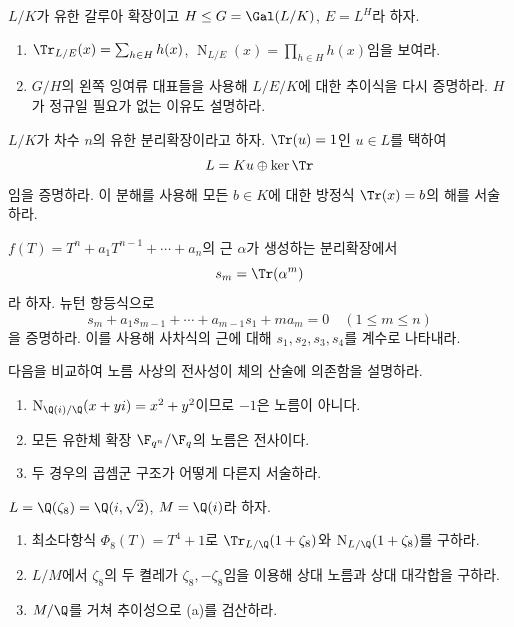 \begin{exercise}
$L/K$가 유한 갈루아 확장이고 $H\le G=\Gal(L/K)$, $E=L^H$라 하자.
\begin{enumerate}[label=(\alph*)]
  \item $\Tr_{L/E}(x)=\sum_{h\in H}h(x)$, $\operatorname N_{L/E}(x)=\prod_{h\in H}h(x)$임을 보여라.
  \item $G/H$의 왼쪽 잉여류 대표들을 사용해 $L/E/K$에 대한 추이식을 다시 증명하라. $H$가 정규일 필요가 없는 이유도 설명하라.
\end{enumerate}
\end{exercise}

\begin{exercise}
$L/K$가 차수 $n$의 유한 분리확장이라고 하자. $\Tr(u)=1$인 $u\in L$를 택하여
\[
  L=Ku\oplus\ker\Tr
\]
임을 증명하라. 이 분해를 사용해 모든 $b\in K$에 대한 방정식 $\Tr(x)=b$의 해를 서술하라.
\end{exercise}

\begin{exercise}
$f(T)=T^n+a_1T^{n-1}+\cdots+a_n$의 근 $\alpha$가 생성하는 분리확장에서
\[
  s_m=\Tr(\alpha^m)
\]
라 하자. 뉴턴 항등식으로
\[
  s_m+a_1s_{m-1}+\cdots+a_{m-1}s_1+ma_m=0
  \quad(1\le m\le n)
\]
을 증명하라. 이를 사용해 사차식의 근에 대해 $s_1,s_2,s_3,s_4$를 계수로 나타내라.
\end{exercise}

\begin{exercise}
다음을 비교하여 노름 사상의 전사성이 체의 산술에 의존함을 설명하라.
\begin{enumerate}[label=(\alph*)]
  \item $\operatorname N_{\Q(i)/\Q}(x+yi)=x^2+y^2$이므로 $-1$은 노름이 아니다.
  \item 모든 유한체 확장 $\F_{q^n}/\F_q$의 노름은 전사이다.
  \item 두 경우의 곱셈군 구조가 어떻게 다른지 서술하라.
\end{enumerate}
\end{exercise}

\begin{exercise}
$L=\Q(\zeta_8)=\Q(i,\sqrt2)$, $M=\Q(i)$라 하자.
\begin{enumerate}[label=(\alph*)]
  \item 최소다항식 $\Phi_8(T)=T^4+1$로 $\Tr_{L/\Q}(1+\zeta_8)$와 $\operatorname N_{L/\Q}(1+\zeta_8)$를 구하라.
  \item $L/M$에서 $\zeta_8$의 두 켤레가 $\zeta_8,-\zeta_8$임을 이용해 상대 노름과 상대 대각합을 구하라.
  \item $M/\Q$를 거쳐 추이성으로 (a)를 검산하라.
\end{enumerate}
\end{exercise}
